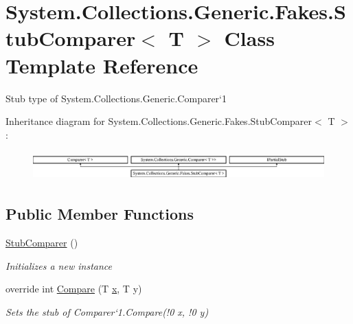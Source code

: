 \hypertarget{class_system_1_1_collections_1_1_generic_1_1_fakes_1_1_stub_comparer_3_01_t_01_4}{\section{System.\-Collections.\-Generic.\-Fakes.\-Stub\-Comparer$<$ T $>$ Class Template Reference}
\label{class_system_1_1_collections_1_1_generic_1_1_fakes_1_1_stub_comparer_3_01_t_01_4}
}


Stub type of System.\-Collections.\-Generic.\-Comparer`1 


Inheritance diagram for System.\-Collections.\-Generic.\-Fakes.\-Stub\-Comparer$<$ T $>$\-:\begin{figure}[H]
\begin{center}
\leavevmode
\includegraphics[height=1.134752cm]{class_system_1_1_collections_1_1_generic_1_1_fakes_1_1_stub_comparer_3_01_t_01_4}
\end{center}
\end{figure}
\subsection*{Public Member Functions}
\begin{DoxyCompactItemize}
\item 
\hyperlink{class_system_1_1_collections_1_1_generic_1_1_fakes_1_1_stub_comparer_3_01_t_01_4_a7550a6fb4487c8cf4bf420a796952df8}{Stub\-Comparer} ()
\begin{DoxyCompactList}\small\item\em Initializes a new instance\end{DoxyCompactList}\item 
override int \hyperlink{class_system_1_1_collections_1_1_generic_1_1_fakes_1_1_stub_comparer_3_01_t_01_4_a7397d0c9151be7984c2a3bd5607a56d7}{Compare} (T \hyperlink{jquery-1_810_82_8min_8js_a5ce50d751c9664d05375c8f5080ed43e}{x}, T y)
\begin{DoxyCompactList}\small\item\em Sets the stub of Comparer`1.Compare(!0 x, !0 y)\end{DoxyCompactList}\end{DoxyCompactItemize}
